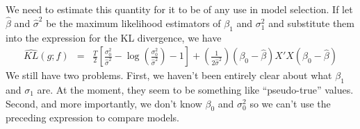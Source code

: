\documentclass[12pt]{article}
\theoremstyle{definition}
\begin{document}
We need to estimate this quantity for it to be of any use in model selection. If let $\widehat{\beta}$ and $\widehat{\sigma}^2$ be the maximum likelihood estimators of $\beta_1$ and $\sigma_1^2$ and substitute them into the expression for the KL divergence, we have
\begin{eqnarray*}
\widehat{KL}(g;f) &=& \frac{T}{2}\left[\frac{\sigma_0^2}{\widehat{\sigma}^2} - \log\left(\frac{\sigma_0^2}{\widehat{\sigma}^2} \right) - 1\right] + \left(\frac{1}{2\widehat{\sigma}^2} \right)\left(\beta_0 - \widehat{\beta}\right)X'X\left(\beta_0 - \widehat{\beta}\right)
\end{eqnarray*}
We still have two problems. First, we haven't been entirely clear about what $\beta_1$ and $\sigma_1$ are. At the moment, they seem to be something like ``pseudo-true'' values. Second, and more importantly, we don't know $\beta_0$ and $\sigma_0^2$ so we can't use the preceding expression to compare models.
\end{document}
